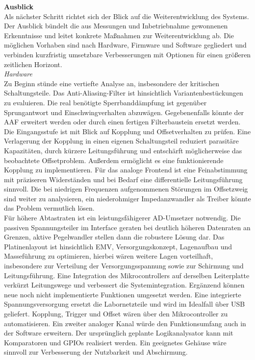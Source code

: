 \documentclass[a4paper, portrait, 12pt]{scrartcl} %
\begin{document}
\textbf{Ausblick}\\
Als nächster Schritt richtet sich der Blick auf die Weiterentwicklung des Systems. Der Ausblick bündelt die aus Messungen und Inbetriebnahme gewonnenen Erkenntnisse und leitet konkrete Maßnahmen zur Weiterentwicklung ab. Die möglichen Vorhaben sind nach Hardware, Firmware und Software gegliedert und verbinden kurzfristig umsetzbare Verbesserungen mit Optionen für einen größeren zeitlichen Horizont.\\

\emph{Hardware}\\
Zu Beginn stünde eine vertiefte Analyse an, insbesondere der kritischen Schaltungsteile. Das Anti-Aliasing-Filter ist hinsichtlich Variantenbestückungen zu evaluieren. Die real benötigte Sperrbanddämpfung ist gegenüber Sprungantwort und Einschwingverhalten abzuwägen. Gegebenenfalls könnte der AAF erweitert werden oder durch einen fertigen Filterbaustein ersetzt werden. Die Eingangsstufe ist mit Blick auf Kopplung und Offsetverhalten zu prüfen. Eine Verlagerung der Kopplung in einen eigenen Schaltungsteil reduziert parasitäre Kapazitäten, durch kürzere Leitungsführung und entschärft möglicherweise das beobachtete Offsetproblem. Außerdem ermöglicht es eine funktionierende Kopplung zu implementieren. Für das analoge Frontend ist eine Feinabstimmung mit präziseren Widerständen und bei Bedarf eine differentielle Leitungsführung sinnvoll. Die bei niedrigen Frequenzen aufgenommenen Störungen im Offsetzweig sind weiter zu analysieren, ein niederohmiger Impedanzwandler als Treiber könnte das Problem vermutlich lösen.\\
Für höhere Abtastraten ist ein leistungsfähigerer AD-Umsetzer notwendig. Die passiven Spannungsteiler im Interface geraten bei deutlich höheren Datenraten an Grenzen, aktive Pegelwandler stellen dann die robustere Lösung dar. Das Platinenlayout ist hinsichtlich EMV, Versorgungskonzept, Lagenaufbau und Masseführung zu optimieren, hierbei wären weitere Lagen vorteilhaft, insbesondere zur Verteilung der Versorgungsspannung sowie zur Schirmung und Leitungsführung. Eine Integration des Mikrocontrollers auf derselben Leiterplatte verkürzt Leitungswege und verbessert die Systemintegration. Ergänzend können neue noch nicht implementierte Funktionen umgesetzt werden. Eine integrierte Spannungsversorgung ersetzt die Labornetzteile und wird im Idealfall über USB geliefert. Kopplung, Trigger und Offset wären über den Mikrocontroller zu automatisieren. Ein zweiter analoger Kanal würde den Funktionsumfang auch in der Software erweitern. Der ursprünglich geplante Logikanalysator kann mit Komparatoren und GPIOs realisiert werden. Ein geeignetes Gehäuse wäre sinnvoll zur Verbesserung der Nutzbarkeit und Abschirmung.\\
\end{document}
